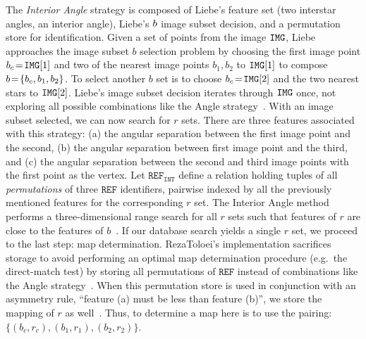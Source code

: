 The \textit{Interior Angle} strategy is composed of Liebe's feature set (two interstar angles, an interior angle), Liebe's $b$ image subset decision, and a permutation store for identification.
Given a set of points from the image $\texttt{IMG}$, Liebe approaches the image subset $b$ selection problem by choosing the first image point $b_c \!=\! \texttt{IMG}[1]$ and two of the nearest image points $b_1, b_2$ to $\texttt{IMG}[1]$ to compose $b \!=\! \{ b_c, b_1, b_2 \}$.
To select another $b$ set is to choose $b_c \!=\! \texttt{IMG}[2]$ and the two nearest stars to $\texttt{IMG}[2]$.
Liebe's image subset decision iterates through $\texttt{IMG}$ once, not exploring all possible combinations like the Angle strategy~\cite{liebe:starTrackersAttitudeDetermination}.
With an image subset selected, we can now search for $r$ sets.
There are three features associated with this strategy: (a) the angular separation between the first image point and the second, (b) the angular separation between first image point and the third, and (c) the angular separation between the second and third image points with the first point as the vertex.
Let $\texttt{REF}_\texttt{INT}$ define a relation holding tuples of all \emph{permutations} of three $\texttt{REF}$ identifiers, pairwise indexed by all the previously mentioned features for the corresponding $r$ set.
The Interior Angle method performs a three-dimensional range search for all $r$ sets such that features of $r$ are close to the features of $b$~\cite{bratt:analysisStarIdentification}.
If our database search yields a single $r$ set, we proceed to the last step: map determination.
RezaToloei's implementation sacrifices storage to avoid performing an optimal map determination procedure (e.g.\ the direct-match test) by storing all permutations of $\texttt{REF}$ instead of combinations like the Angle strategy~\cite{toloei:compositeIdentification}.
When this permutation store is used in conjunction with an asymmetry rule, ``feature (a) must be less than feature (b)'', we store the mapping of $r$ as well~\cite{anderson:autonomousStarSensing}.
Thus, to determine a map here is to use the pairing: $\{(b_c, r_c), (b_1, r_1), (b_2, r_2)\}$.


